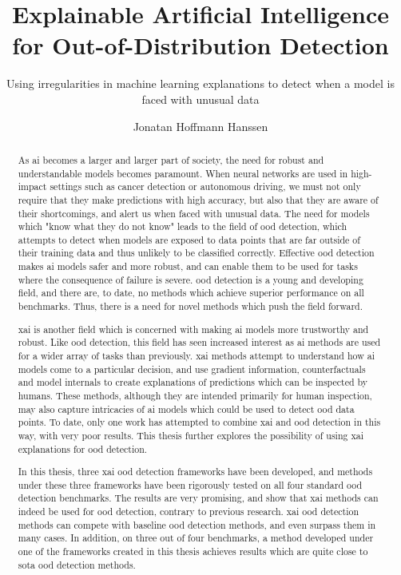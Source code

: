 \documentclass[UKenglish]{uiomasterthesis} %
\title{Explainable Artificial Intelligence for Out-of-Distribution Detection}
\subtitle{Using irregularities in machine learning explanations to detect when a model is faced with unusual data}
\author{Jonatan Hoffmann Hanssen}
\theoremstyle{definition}
\begin{document}
\uiomasterfp[dept={Department of Informatics},
program={Robotics and Intelligent Systems},
supervisors={Hugo Lewi Hammer \and Kyrre Harald Glette}, long]

\frontmatter{}
\begin{abstract}
    As \ac{ai} becomes a larger and larger part of society, the need for robust and understandable models becomes paramount. When neural networks are used in high-impact settings such as cancer detection or autonomous driving, we must not only require that they make predictions with high accuracy, but also that they are aware of their shortcomings, and alert us when faced with unusual data. The need for models which "know what they do not know" leads to the field of \ac{ood} detection, which attempts to detect when models are exposed to data points that are far outside of their training data and thus unlikely to be classified correctly. Effective \ac{ood} detection makes \ac{ai} models safer and more robust, and can enable them to be used for tasks where the consequence of failure is severe. \ac{ood} detection is a young and developing field, and there are, to date, no methods which achieve superior performance on all benchmarks. Thus, there is a need for novel methods which push the field forward.

    \ac{xai} is another field which is concerned with making \ac{ai} models more trustworthy and robust. Like \ac{ood} detection, this field has seen increased interest as \ac{ai} methods are used for a wider array of tasks than previously. \ac{xai} methods attempt to understand how \ac{ai} models come to a particular decision, and use gradient information, counterfactuals and model internals to create explanations of predictions which can be inspected by humans. These methods, although they are intended primarily for human inspection, may also capture intricacies of \ac{ai} models which could be used to detect \ac{ood} data points. To date, only one work has attempted to combine \ac{xai} and \ac{ood} detection in this way, with very poor results. This thesis further explores the possibility of using \ac{xai} explanations for \ac{ood} detection.

    In this thesis, three \ac{xai} \ac{ood} detection frameworks have been developed, and methods under these three frameworks have been rigorously tested on all four standard \ac{ood} detection benchmarks. The results are very promising, and show that \ac{xai} methods can indeed be used for \ac{ood} detection, contrary to previous research. \ac{xai} \ac{ood} detection methods can compete with baseline \ac{ood} detection methods, and even surpass them in many cases. In addition, on three out of four benchmarks, a method developed under one of the frameworks created in this thesis achieves results which are quite close to \ac{sota} \ac{ood} detection methods.
\end{abstract}
\end{document}
